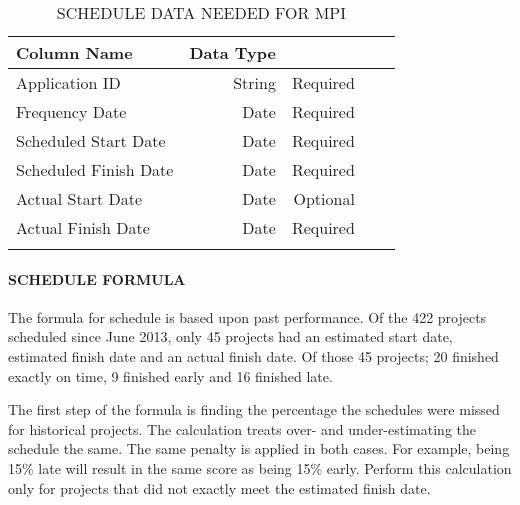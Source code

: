 \documentclass[SDSUThesis.tex]{subfiles}
\begin{document}
                \begin{longtable}{@{}l rr rr}
                    \toprule%
                     \centering%
                     {\bfseries Column Name}
                     & {\bfseries Data Type}
                     &  \\
                    
                    \cmidrule[0.4pt](r{0.125em}){1-1}%
                    \cmidrule[0.4pt](lr{0.125em}){2-2}%
                    \cmidrule[0.4pt](l{0.125em}){3-3}%
                    \endhead
                    
                    Application ID & String  & Required \\
                    \myrowcolour%
                    Frequency Date & Date & Required \\
                    Scheduled Start Date & Date & Required \\
                    \myrowcolour%
                    Scheduled Finish Date & Date & Required \\
                    Actual Start Date & Date  & Optional \\
                    \myrowcolour%
                    Actual Finish Date & Date  & Required \\
                    
                    \bottomrule
                    
                    \caption{SCHEDULE DATA NEEDED FOR MPI}
                    \label{tab:sched}
                \end{longtable}
                    
            \paragraph{SCHEDULE FORMULA}
    
                The formula for schedule is based upon past performance.  Of the 422 projects
                scheduled since June 2013, only 45 projects had an estimated start date, estimated
                finish date and an actual finish date.  Of those 45 projects; 20 finished exactly on time,
                9 finished early and 16 finished late.  
                
                The first step of the formula is finding the percentage the schedules were missed for 
                historical projects.  The calculation treats over- and under-estimating the schedule
                the same.  The same penalty is applied in both cases.  For example, being 15\% late
                will result in the same score as being 15\% early. Perform this calculation
                only for projects that did not exactly meet the estimated finish date.
                
\end{document}
